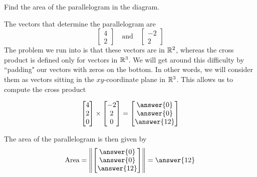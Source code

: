 \documentclass{ximera}
\begin{document}
\begin{example}\label{ex:areaofparallelogram}
Find the area of the parallelogram in the diagram.
\begin{center}
\end{center}
\begin{explanation}
The vectors that determine the parallelogram are
$$\begin{bmatrix}4\\2\end{bmatrix}\quad\text{and}\quad\begin{bmatrix}-2\\2\end{bmatrix}$$
The problem we run into is that these vectors are in $\mathbb{R}^2$, whereas the cross product is defined only for vectors in $\mathbb{R}^3$.  We will get around this difficulty by ``padding" our vectors with zeros on the bottom.  In other words, we will consider them as vectors sitting in the $xy$-coordinate plane in $\mathbb{R}^3$.  This allows us to compute the cross product

$$\begin{bmatrix}4\\2\\0\end{bmatrix}\times\begin{bmatrix}-2\\2\\0\end{bmatrix}=\begin{bmatrix}\answer{0}\\\answer{0}\\\answer{12}\end{bmatrix}$$

The area of the parallelogram is then given by
$$\mbox{Area}=\norm{\begin{bmatrix}\answer{0}\\\answer{0}\\\answer{12}\end{bmatrix}}=\answer{12}$$
\end{explanation}
\end{example}
 
\end{document}
